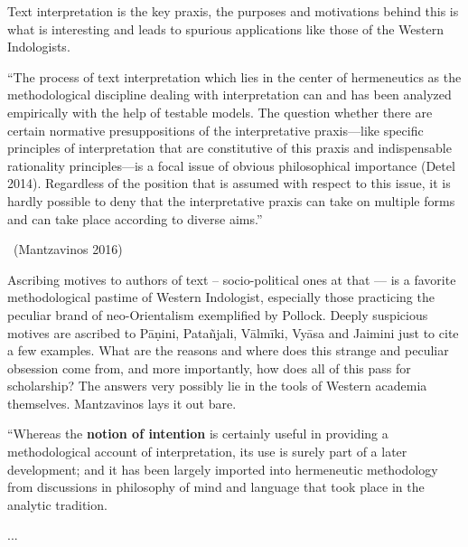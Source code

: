 \newpage

Text interpretation is the key praxis, the purposes and motivations behind this is what is interesting and leads to spurious applications like those of the Western Indologists. 
\begin{myquote}
“The process of text interpretation which lies in the center of hermeneutics as the methodological discipline dealing with interpretation can and has been analyzed empirically with the help of testable models. The question whether there are certain normative presuppositions of the interpretative praxis—like specific principles of interpretation that are constitutive of this praxis and indispensable rationality principles—is a focal issue of obvious philosophical importance (Detel 2014). Regardless of the position that is assumed with respect to this issue, it is hardly possible to deny that the interpretative praxis can take on multiple forms and can take place according to diverse aims.”

\vskip -4pt

~\hfill (Mantzavinos 2016)
\end{myquote}

Ascribing motives to authors of text – socio-political ones at that — is a favorite methodological pastime of Western Indologist, especially those practicing the peculiar brand of neo-Orientalism exemplified by Pollock. Deeply suspicious motives are ascribed to Pāṇini, Patañjali, Vālmīki, Vyāsa and Jaimini just to cite a few examples. What are the reasons and where does this strange and peculiar obsession come from, and more importantly, how does all of this pass for scholarship? The answers very possibly lie in the tools of Western academia themselves. Mantzavinos lays it out bare.

\begin{myquote}
“Whereas the \textbf{notion of intention} is certainly useful in providing a methodological account of interpretation, its use is surely part of a later development; and it has been largely imported into hermeneutic methodology from discussions in philosophy of mind and language that took place in the analytic tradition.
\end{myquote}

\begin{myquote}
...
\end{myquote}


